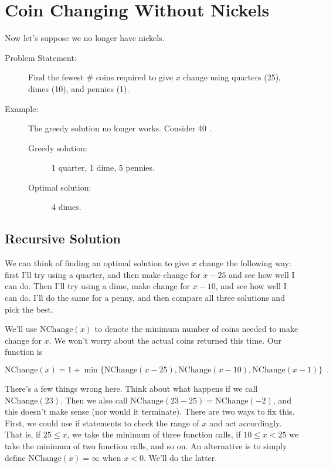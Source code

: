 \documentclass[paper=a4, fontsize=11pt]{scrartcl} %
\numberwithin{equation}{section} %
\numberwithin{figure}{section} %
\numberwithin{table}{section} %
\begin{document}
\section{Coin Changing Without Nickels}
Now let's suppose we no longer have nickels.

\begin{description}
\item[Problem Statement:] Find the fewest \# coins required to give $x$ change using quarters (25\cent), dimes (10\cent), and pennies (1\cent).
\item[Example:] The greedy solution no longer works. Consider 40 \cent.
    \begin{description}
    \item[Greedy solution:] 1 quarter, 1 dime, 5 pennies.
    \item[Optimal solution:] 4 dimes.
    \end{description}
\end{description}

\subsection{Recursive Solution}
We can think of finding an optimal solution to give $x$ change the following way: first I'll try using a quarter, and then make change for $x - 25$ and see how well I can do. Then I'll try using a dime, make change for $x - 10$, and see how well I can do. I'll do the same for a penny, and then compare all three solutions and pick the best.

We'll use $\mathrm{NChange}(x)$ to denote the minimum number of coins needed to make change for $x$.
We won't worry about the actual coins returned this time.
Our function is

\begin{equation}\label{NChangeEq}
\mathrm{NChange}(x) = 1 + \min\{\mathrm{NChange}(x-25), \mathrm{NChange}(x-10), \mathrm{NChange}(x-1)\} \enspace .
\end{equation}

There's a few things wrong here.
Think about what happens if we call $\mathrm{NChange}(23)$.
Then we also call $\mathrm{NChange}(23-25) = \mathrm{NChange}(-2)$, and this doesn't make sense (nor would it terminate).
There are two ways to fix this.
First, we could use if statements to check the range of $x$ and act accordingly.
That is, if $25 \leq x$, we take the minimum of three function calls, if $10 \leq x < 25$ we take the minimum of two function calls, and so on.
An alternative is to simply define $\mathrm{NChange}(x) = \infty$ when $x < 0$.
We'll do the latter.
\end{document}
